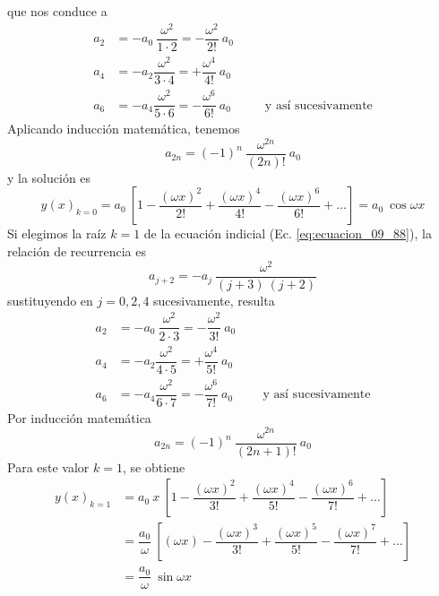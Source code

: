 que nos conduce a
\begin{align*}
a_{2} &= - a_{0} \: \dfrac{\omega^{2}}{1 \cdot 2} = - \dfrac{\omega^{2}}{2!} \: a_{0} \nonumber \\
a_{4} &= - a_{2} \dfrac{\omega^{2}}{3 \cdot 4} = + \dfrac{\omega^{4}}{4!} \: a_{0} \nonumber \\
a_{6} &= - a_{4} \dfrac{\omega^{2}}{5 \cdot 6} = - \dfrac{\omega^{6}}{6!} \: a_{0} \nonumber \hspace{1cm} \mbox{ y así sucesivamente}
\end{align*}
Aplicando inducción matemática, tenemos
\begin{equation}
a_{2n} = (-1)^{n} \: \dfrac{\omega^{2n}}{(2n)!} \: a_{0}
\label{eq:ecuacion_09_90}
\end{equation}
y la solución es
\begin{equation}
y(x)_{k = 0} = a_{0} \: \left[ 1 - \dfrac{(\omega x)^{2}}{2!} + \dfrac{(\omega x)^{4}}{4!} - \dfrac{(\omega x)^{6}}{6!} + \ldots \right] = a_{0} \: \cos \omega x
\label{eq:ecuacion_09_91}  
\end{equation}
Si elegimos la raíz $k = 1$ de la ecuación indicial (Ec. \ref{eq:ecuacion_09_88}), la relación de recurrencia es
\begin{equation}
a_{j + 2} = - a_{j} \: \dfrac{\omega^{2}}{(j+3) \: (j+2)}
\label{eq:ecuacion_09_92}
\end{equation}
sustituyendo en $j = 0, 2, 4$ sucesivamente, resulta
\begin{align*}
a_{2} &= - a_{0} \: \dfrac{\omega^{2}}{2 \cdot 3} = - \dfrac{\omega^{2}}{3!} \: a_{0} \nonumber \\
a_{4} &= - a_{2} \dfrac{\omega^{2}}{4 \cdot 5} = + \dfrac{\omega^{4}}{5!}  \: a_{0} \nonumber \\
a_{6} &= - a_{4} \dfrac{\omega^{2}}{6 \cdot 7} = - \dfrac{\omega^{6}}{7!} \: a_{0} \nonumber \hspace{1cm} \mbox{y así sucesivamente}
\end{align*}
Por inducción matemática
\begin{equation}
a_{2n} = (-1)^{n} \: \dfrac{\omega^{2n}}{(2n + 1)!} \: a_{0}
\label{eq:ecuacion_09_93}
\end{equation}
Para este valor $k = 1$, se obtiene
\begin{align}
y(x)_{k = 1} &= a_{0} \: x \: \left[ 1 - \dfrac{(\omega x)^{2}}{3!} + \dfrac{(\omega x)^{4}}{5!} - \dfrac{(\omega x)^{6}}{7!} + \ldots \right] \nonumber \\
&= \dfrac{a_{0}}{\omega} \: \left[ (\omega x) - \dfrac{(\omega x)^{3}}{3!} + \dfrac{(\omega x)^{5}}{5!} - \dfrac{(\omega x)^{7}}{7!} + \ldots \right] \nonumber \\
&= \dfrac{a_{0}}{\omega} \: \sin \omega x
\label{eq:ecuacion_09_94}
\end{align}
